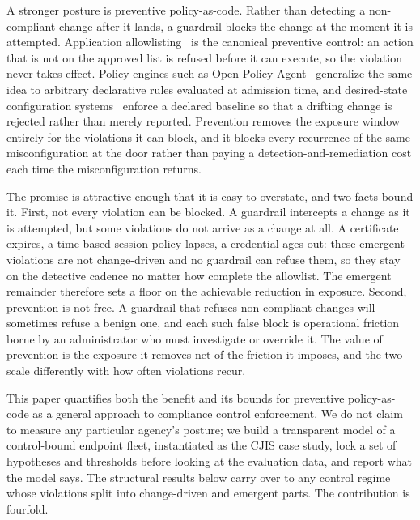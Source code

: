 \documentclass[journal]{IEEEtran}
\begin{document}
A stronger posture is preventive policy-as-code. Rather than detecting a non-compliant change after
it lands, a guardrail blocks the change at the moment it is attempted. Application
allowlisting~\cite{nist80167} is the canonical preventive control: an action that is not on the
approved list is refused before it can execute, so the violation never takes effect. Policy engines
such as Open Policy Agent~\cite{opa} generalize the same idea to arbitrary declarative rules
evaluated at admission time, and desired-state configuration systems~\cite{powershelldsc} enforce a
declared baseline so that a drifting change is rejected rather than merely reported. Prevention
removes the exposure window entirely for the violations it can block, and it blocks every recurrence
of the same misconfiguration at the door rather than paying a detection-and-remediation cost each
time the misconfiguration returns.

The promise is attractive enough that it is easy to overstate, and two facts bound it. First, not
every violation can be blocked. A guardrail intercepts a change as it is attempted, but some
violations do not arrive as a change at all. A certificate expires, a time-based session policy
lapses, a credential ages out: these emergent violations are not change-driven and no guardrail can
refuse them, so they stay on the detective cadence no matter how complete the allowlist. The
emergent remainder therefore sets a floor on the achievable reduction in exposure. Second,
prevention is not free. A guardrail that refuses non-compliant changes will sometimes refuse a
benign one, and each such false block is operational friction borne by an administrator who must
investigate or override it. The value of prevention is the exposure it removes net of the friction
it imposes, and the two scale differently with how often violations recur.

This paper quantifies both the benefit and its bounds for preventive policy-as-code as a general
approach to compliance control enforcement. We do not claim to measure any particular agency's
posture; we build a transparent model of a control-bound endpoint fleet, instantiated as the CJIS
case study, lock a set of hypotheses and thresholds before looking at the evaluation data, and
report what the model says. The structural results below carry over to any control regime whose
violations split into change-driven and emergent parts. The contribution is fourfold.
\end{document}
